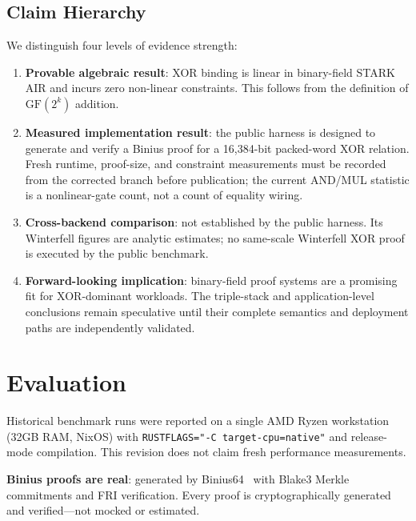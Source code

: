 \documentclass[11pt,twocolumn]{article}
\begin{document}
\subsection{Claim Hierarchy}

We distinguish four levels of evidence strength:

\begin{enumerate}
    \item \textbf{Provable algebraic result}: XOR binding is linear in binary-field STARK AIR and incurs zero non-linear constraints. This follows from the definition of $\mathrm{GF}(2^k)$ addition.
    \item \textbf{Measured implementation result}: the public harness is designed to generate and verify a Binius proof for a 16,384-bit packed-word XOR relation. Fresh runtime, proof-size, and constraint measurements must be recorded from the corrected branch before publication; the current AND/MUL statistic is a nonlinear-gate count, not a count of equality wiring.
    \item \textbf{Cross-backend comparison}: not established by the public harness. Its Winterfell figures are analytic estimates; no same-scale Winterfell XOR proof is executed by the public benchmark.
    \item \textbf{Forward-looking implication}: binary-field proof systems are a promising fit for XOR-dominant workloads. The triple-stack and application-level conclusions remain speculative until their complete semantics and deployment paths are independently validated.
\end{enumerate}

\section{Evaluation}
\label{sec:evaluation}

Historical benchmark runs were reported on a single AMD Ryzen workstation (32GB RAM, NixOS) with \texttt{RUSTFLAGS="-C target-cpu=native"} and release-mode compilation. This revision does not claim fresh performance measurements.

\textbf{Binius proofs are real}: generated by Binius64~\cite{binius64} with Blake3 Merkle commitments and FRI verification. Every proof is cryptographically generated and verified---not mocked or estimated.
\end{document}
